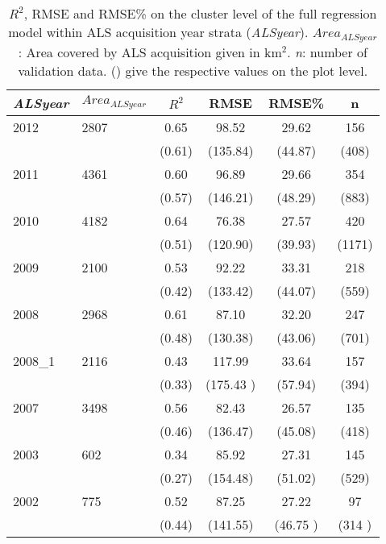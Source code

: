 \begin{table}[ht]
	\begin{center}
		\caption{$R^2$, RMSE and RMSE\% on the cluster level of the full regression model within ALS acquisition year strata (\textit{ALSyear}). $Area_{ALSyear}$: Area covered by ALS acquisition given in km$^2$. \textit{n}: number of validation data. () give the respective values on the plot level.}
		\label{tab:adj_r2_within}
		{\small %
			\begin{tabular}{llcccc}
				\hline
				\textit{ALSyear} & $Area_{ALSyear}$ & $R^2$ & RMSE & RMSE\% & n \\ 
				\hline \hline
				2012  & 2807  &  0.65  &  98.52  &  29.62 &  156  \\ 
				&&             (0.61) & (135.84) & (44.87) & (408) \\ \hline

				2011  & 4361  &  0.60   & 96.89   &  29.66 & 354  \\ 
				&&             (0.57)  & (146.21) & (48.29) & (883) \\ \hline

				2010 & 4182     & 0.64  & 76.38   & 27.57 & 420 \\ 
				&&             (0.51)  & (120.90) & (39.93) & (1171) \\ \hline
  
				2009 & 2100     & 0.53  & 92.22  & 33.31 & 218  \\   
				&&             (0.42)  & (133.42) & (44.07) & (559) \\ \hline
             
				2008 & 2968     & 0.61  & 87.10   & 32.20 & 247  \\        
				&&             (0.48)  & (130.38) & (43.06) & (701) \\ \hline
	                    
				2008\_1 & 2116  & 0.43  & 117.99  & 33.64 & 157  \\      
				&&             (0.33)  & (175.43 ) & (57.94) & (394) \\ \hline
         
				2007 & 3498     & 0.56  & 82.43  & 26.57 & 135 \\ 
				&&             (0.46)  & (136.47)  & (45.08) & (418) \\ \hline
	
				2003 & 602      & 0.34  & 85.92  & 27.31 & 145  \\ 
				&&             (0.27)  & (154.48) & (51.02) & (529) \\ \hline
		
				2002 & 775      & 0.52  & 87.25  & 27.22 & 97  \\ 
				&&             (0.44) & (141.55) & (46.75 ) & (314 ) \\
				\hline
				\hline
			\end{tabular}
		}%
	\end{center}
\end{table}



